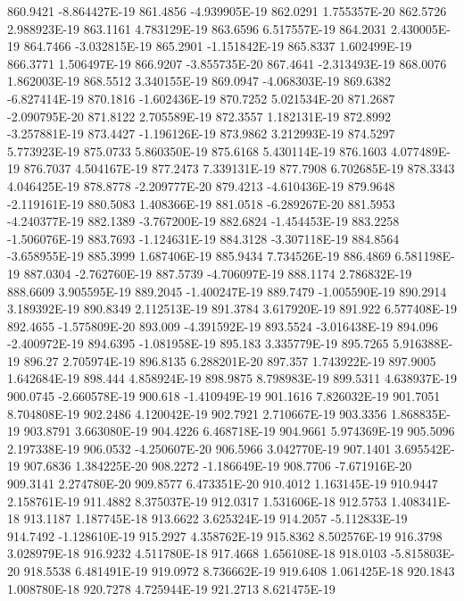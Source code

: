 860.9421  -8.864427E-19
861.4856  -4.939905E-19
862.0291  1.755357E-20
862.5726  2.988923E-19
863.1161  4.783129E-19
863.6596  6.517557E-19
864.2031  2.430005E-19
864.7466  -3.032815E-19
865.2901  -1.151842E-19
865.8337  1.602499E-19
866.3771  1.506497E-19
866.9207  -3.855735E-20
867.4641  -2.313493E-19
868.0076  1.862003E-19
868.5512  3.340155E-19
869.0947  -4.068303E-19
869.6382  -6.827414E-19
870.1816  -1.602436E-19
870.7252  5.021534E-20
871.2687  -2.090795E-20
871.8122  2.705589E-19
872.3557  1.182131E-19
872.8992  -3.257881E-19
873.4427  -1.196126E-19
873.9862  3.212993E-19
874.5297  5.773923E-19
875.0733  5.860350E-19
875.6168  5.430114E-19
876.1603  4.077489E-19
876.7037  4.504167E-19
877.2473  7.339131E-19
877.7908  6.702685E-19
878.3343  4.046425E-19
878.8778  -2.209777E-20
879.4213  -4.610436E-19
879.9648  -2.119161E-19
880.5083  1.408366E-19
881.0518  -6.289267E-20
881.5953  -4.240377E-19
882.1389  -3.767200E-19
882.6824  -1.454453E-19
883.2258  -1.506076E-19
883.7693  -1.124631E-19
884.3128  -3.307118E-19
884.8564  -3.658955E-19
885.3999  1.687406E-19
885.9434  7.734526E-19
886.4869  6.581198E-19
887.0304  -2.762760E-19
887.5739  -4.706097E-19
888.1174  2.786832E-19
888.6609  3.905595E-19
889.2045  -1.400247E-19
889.7479  -1.005590E-19
890.2914  3.189392E-19
890.8349  2.112513E-19
891.3784  3.617920E-19
891.922  6.577408E-19
892.4655  -1.575809E-20
893.009  -4.391592E-19
893.5524  -3.016438E-19
894.096  -2.400972E-19
894.6395  -1.081958E-19
895.183  3.335779E-19
895.7265  5.916388E-19
896.27  2.705974E-19
896.8135  6.288201E-20
897.357  1.743922E-19
897.9005  1.642684E-19
898.444  4.858924E-19
898.9875  8.798983E-19
899.5311  4.638937E-19
900.0745  -2.660578E-19
900.618  -1.410949E-19
901.1616  7.826032E-19
901.7051  8.704808E-19
902.2486  4.120042E-19
902.7921  2.710667E-19
903.3356  1.868835E-19
903.8791  3.663080E-19
904.4226  6.468718E-19
904.9661  5.974369E-19
905.5096  2.197338E-19
906.0532  -4.250607E-20
906.5966  3.042770E-19
907.1401  3.695542E-19
907.6836  1.384225E-20
908.2272  -1.186649E-19
908.7706  -7.671916E-20
909.3141  2.274780E-20
909.8577  6.473351E-20
910.4012  1.163145E-19
910.9447  2.158761E-19
911.4882  8.375037E-19
912.0317  1.531606E-18
912.5753  1.408341E-18
913.1187  1.187745E-18
913.6622  3.625324E-19
914.2057  -5.112833E-19
914.7492  -1.128610E-19
915.2927  4.358762E-19
915.8362  8.502576E-19
916.3798  3.028979E-18
916.9232  4.511780E-18
917.4668  1.656108E-18
918.0103  -5.815803E-20
918.5538  6.481491E-19
919.0972  8.736662E-19
919.6408  1.061425E-18
920.1843  1.008780E-18
920.7278  4.725944E-19
921.2713  8.621475E-19
